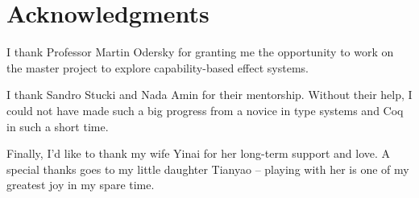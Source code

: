 \section*{\centering Acknowledgments}

I thank Professor Martin Odersky for granting me the opportunity to
work on the master project to explore capability-based effect systems.

I thank Sandro Stucki and Nada Amin for their mentorship. Without
their help, I could not have made such a big progress from a novice in
type systems and Coq in such a short time.

Finally, I'd like to thank my wife Yinai for her long-term support and
love. A special thanks goes to my little daughter Tianyao -- playing
with her is one of my greatest joy in my spare time.
